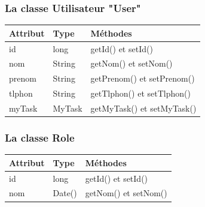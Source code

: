 \subsubsection*{La classe Utilisateur "User"}
\begin{table}[H]
	\centering\setlength\tabcolsep{1cm}
	
	\begin{tabular}{|l|l|l|}
		\hline
		\textbf{Attribut}  & \textbf{Type} & \multicolumn{1}{l|}{\textbf{Méthodes}} \\ \hline
		
		id & long & getId() et setId()\\ \cline{1-2}
		nom & String & getNom() et setNom()\\ \cline{1-2}
			prenom & String & getPrenom() et setPrenom()\\ \cline{1-2}
						tlphon & String & getTlphon() et setTlphon()\\ \cline{1-2}
		myTask & MyTask  & getMyTask() et setMyTask()   \\ \hline
	\end{tabular}
\end{table}




\subsubsection*{La classe Role}
\begin{table}[H]
	\centering\setlength\tabcolsep{1.2cm}
	
	\begin{tabular}{|l|l|l|}
		\hline
		\textbf{Attribut}  & \textbf{Type} & \multicolumn{1}{l|}{\textbf{Méthodes}} \\ \hline
		
		id & long & getId() et setId()\\ \cline{1-2}
		nom & Date() & getNom() et setNom()\\ \hline
	\end{tabular}
\end{table}






